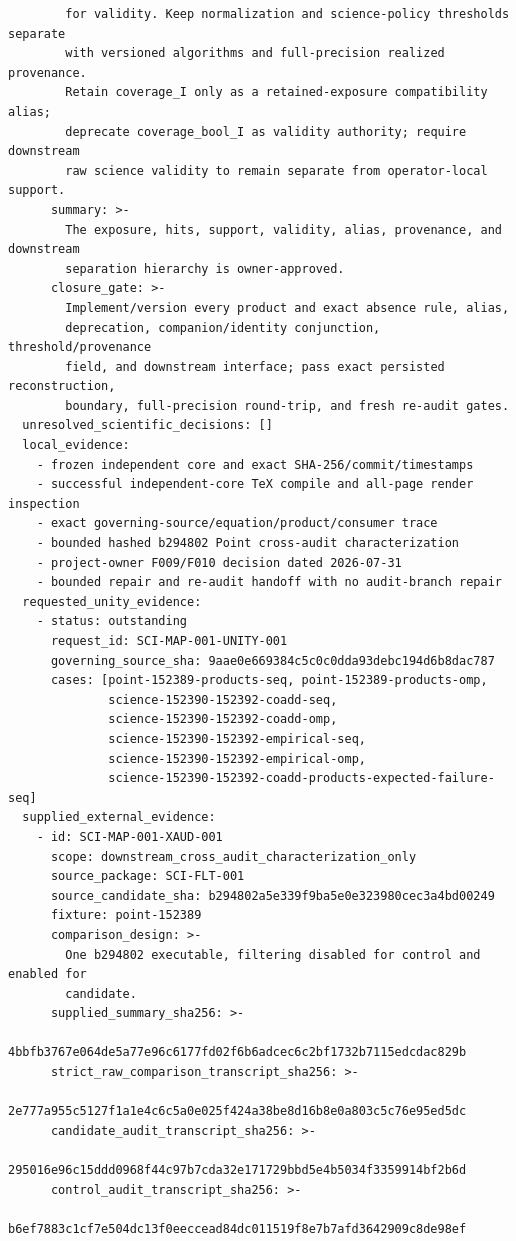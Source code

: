 \documentclass[11pt]{article}
\begin{document}
\begin{small}
\begin{verbatim}
        for validity. Keep normalization and science-policy thresholds separate
        with versioned algorithms and full-precision realized provenance.
        Retain coverage_I only as a retained-exposure compatibility alias;
        deprecate coverage_bool_I as validity authority; require downstream
        raw science validity to remain separate from operator-local support.
      summary: >-
        The exposure, hits, support, validity, alias, provenance, and downstream
        separation hierarchy is owner-approved.
      closure_gate: >-
        Implement/version every product and exact absence rule, alias,
        deprecation, companion/identity conjunction, threshold/provenance
        field, and downstream interface; pass exact persisted reconstruction,
        boundary, full-precision round-trip, and fresh re-audit gates.
  unresolved_scientific_decisions: []
  local_evidence:
    - frozen independent core and exact SHA-256/commit/timestamps
    - successful independent-core TeX compile and all-page render inspection
    - exact governing-source/equation/product/consumer trace
    - bounded hashed b294802 Point cross-audit characterization
    - project-owner F009/F010 decision dated 2026-07-31
    - bounded repair and re-audit handoff with no audit-branch repair
  requested_unity_evidence:
    - status: outstanding
      request_id: SCI-MAP-001-UNITY-001
      governing_source_sha: 9aae0e669384c5c0c0dda93debc194d6b8dac787
      cases: [point-152389-products-seq, point-152389-products-omp,
              science-152390-152392-coadd-seq,
              science-152390-152392-coadd-omp,
              science-152390-152392-empirical-seq,
              science-152390-152392-empirical-omp,
              science-152390-152392-coadd-products-expected-failure-seq]
  supplied_external_evidence:
    - id: SCI-MAP-001-XAUD-001
      scope: downstream_cross_audit_characterization_only
      source_package: SCI-FLT-001
      source_candidate_sha: b294802a5e339f9ba5e0e323980cec3a4bd00249
      fixture: point-152389
      comparison_design: >-
        One b294802 executable, filtering disabled for control and enabled for
        candidate.
      supplied_summary_sha256: >-
        4bbfb3767e064de5a77e96c6177fd02f6b6adcec6c2bf1732b7115edcdac829b
      strict_raw_comparison_transcript_sha256: >-
        2e777a955c5127f1a1e4c6c5a0e025f424a38be8d16b8e0a803c5c76e95ed5dc
      candidate_audit_transcript_sha256: >-
        295016e96c15ddd0968f44c97b7cda32e171729bbd5e4b5034f3359914bf2b6d
      control_audit_transcript_sha256: >-
        b6ef7883c1cf7e504dc13f0eeccead84dc011519f8e7b7afd3642909c8de98ef

\end{verbatim}
\end{small}
\end{document}
